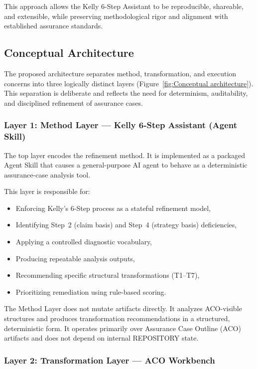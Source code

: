 \documentclass[12pt,twoside,a4paper]{article}
\begin{document}
This approach allows the Kelly 6-Step Assistant to be reproducible, shareable, and extensible, while preserving methodological rigor and alignment with established assurance standards.

\subsection{Conceptual Architecture}

The proposed architecture separates method, transformation, and execution concerns into three logically distinct layers (Figure~\ref{fig:Conceptual architecture}). This separation is deliberate and reflects the need for determinism, auditability, and disciplined refinement of assurance cases.

\subsubsection{Layer 1: Method Layer --- Kelly 6-Step Assistant (Agent Skill)}

The top layer encodes the refinement method. It is implemented as a packaged Agent Skill that causes a general-purpose AI agent to behave as a deterministic assurance-case analysis tool.

This layer is responsible for:

\begin{itemize}
  \item Enforcing Kelly’s 6-Step process as a stateful refinement model,
  \item Identifying Step~2 (claim basis) and Step~4 (strategy basis) deficiencies,
  \item Applying a controlled diagnostic vocabulary,
  \item Producing repeatable analysis outputs,
  \item Recommending specific structural transformations (T1--T7),
  \item Prioritizing remediation using rule-based scoring.
\end{itemize}

The Method Layer does not mutate artifacts directly. It analyzes ACO-visible structures and produces transformation recommendations in a structured, deterministic form. It operates primarily over Assurance Case Outline (ACO) artifacts and does not depend on internal REPOSITORY state.

\subsubsection{Layer 2: Transformation Layer --- ACO Workbench}
\end{document}
